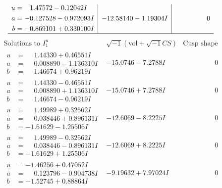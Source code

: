 \documentclass[1p]{elsarticle_modified}
\theoremstyle{definition}
\newcommand{\I}{\sqrt{-1}}
\begin{document}
$$\begin{array}{c|c|c}
\begin{aligned}
u &= \phantom{-}1.47572 - 0.12042 I \\
a &= -0.127528 - 0.972093 I \\
b &= -0.869101 + 0.330100 I\end{aligned}
 & -12.58140 - 1.19304 I & \phantom{-0.000000 } 0\\
 \hline 
 \end{array}$$\newpage$$\begin{array}{c|c|c}  
\text{Solutions to }I^u_{1}& \I (\text{vol} + \sqrt{-1}CS) & \text{Cusp shape}\\
 \hline 
\begin{aligned}
u &= \phantom{-}1.44330 + 0.46551 I \\
a &= \phantom{-}0.008890 - 1.136310 I \\
b &= \phantom{-}1.46674 + 0.96219 I\end{aligned}
 & -15.0746 - 7.2788 I & \phantom{-0.000000 } 0 \\ \hline\begin{aligned}
u &= \phantom{-}1.44330 - 0.46551 I \\
a &= \phantom{-}0.008890 + 1.136310 I \\
b &= \phantom{-}1.46674 - 0.96219 I\end{aligned}
 & -15.0746 + 7.2788 I & \phantom{-0.000000 } 0 \\ \hline\begin{aligned}
u &= \phantom{-}1.49989 + 0.32562 I \\
a &= \phantom{-}0.038446 + 0.896131 I \\
b &= -1.61629 - 1.25506 I\end{aligned}
 & -12.6069 - 8.2225 I & \phantom{-0.000000 } 0 \\ \hline\begin{aligned}
u &= \phantom{-}1.49989 - 0.32562 I \\
a &= \phantom{-}0.038446 - 0.896131 I \\
b &= -1.61629 + 1.25506 I\end{aligned}
 & -12.6069 + 8.2225 I & \phantom{-0.000000 } 0 \\ \hline\begin{aligned}
u &= -1.46256 + 0.47052 I \\
a &= \phantom{-}0.123796 - 0.904738 I \\
b &= -1.52745 + 0.88864 I\end{aligned}
 & -9.19632 + 7.97024 I & \phantom{-0.000000 } 0 \\ \hline\begin{aligned}

\end{aligned}
\end{array}$$
\end{document}
